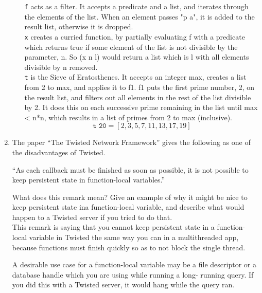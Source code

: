 \documentclass[10pt]{article}
\begin{document}
\begin{enumerate}
\begin{enumerate}
                \texttt{f} acts as a filter. It accepts a predicate and a list, and iterates through
                the elements of the list. When an element passes "p a", it is added to
                the result list, otherwise it is dropped.\\

                \texttt{x} creates a curried function, by partially evaluating f with a predicate
                which returns true if some element of the list is not divisible by the
                parameter, n. So (x n l) would return a list which is l with all
                elements divisible by n removed.\\

                \texttt{t} is the Sieve of Eratosthenes. It accepts an integer max, creates a list
                from 2 to max, and applies it to f1. f1 puts the first prime number, 2,
                on the result list, and filters out all elements in the rest of the list
                divisible by 2. It does this on each successive prime remaining in the
                list until max < n*n, which results in a list of primes from 2 to max
                (inclusive).
                \[\texttt{t 20} = [2, 3, 5, 7, 11, 13, 17, 19]\]
        \end{enumerate}

        \item The paper ``The Twisted Network Framework'' gives the following as one of the disadvantages of Twisted.

        ``As each callback must be finished as soon as possible, it is not possible to keep persistent state in function-local variables.''

        What does this remark mean? Give an example of why it might be nice to keep persistent state ina function-local variable, and describe what
        would happen to a Twisted server if you tried to do that.\\

        This remark is saying that you cannot keep persistent state in a function-local variable in Twisted the same way you can in
        a multithreaded app, because functions must finish quickly so as to not block the single thread.

        A desirable use case for a function-local variable may be a file descriptor or a database handle which you are using while running a long-
        running query. If you did this with a Twisted server, it would hang while the query ran.


\end{enumerate}
\end{document}
